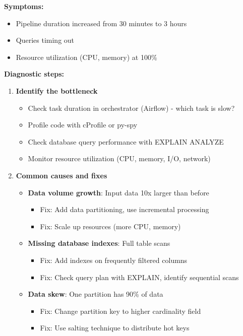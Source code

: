 \textbf{Symptoms:}
\begin{itemize}
    \item Pipeline duration increased from 30 minutes to 3 hours
    \item Queries timing out
    \item Resource utilization (CPU, memory) at 100\%
\end{itemize}

\textbf{Diagnostic steps:}
\begin{enumerate}
    \item \textbf{Identify the bottleneck}
        \begin{itemize}
            \item Check task duration in orchestrator (Airflow) - which task is slow?
            \item Profile code with cProfile or py-spy
            \item Check database query performance with EXPLAIN ANALYZE
            \item Monitor resource utilization (CPU, memory, I/O, network)
        \end{itemize}

    \item \textbf{Common causes and fixes}
        \begin{itemize}
            \item \textbf{Data volume growth}: Input data 10x larger than before
                \begin{itemize}
                    \item Fix: Add data partitioning, use incremental processing
                    \item Fix: Scale up resources (more CPU, memory)
                \end{itemize}

            \item \textbf{Missing database indexes}: Full table scans
                \begin{itemize}
                    \item Fix: Add indexes on frequently filtered columns
                    \item Fix: Check query plan with EXPLAIN, identify sequential scans
                \end{itemize}

            \item \textbf{Data skew}: One partition has 90\% of data
                \begin{itemize}
                    \item Fix: Change partition key to higher cardinality field
                    \item Fix: Use salting technique to distribute hot keys
                \end{itemize}


\end{itemize}
\end{enumerate}
